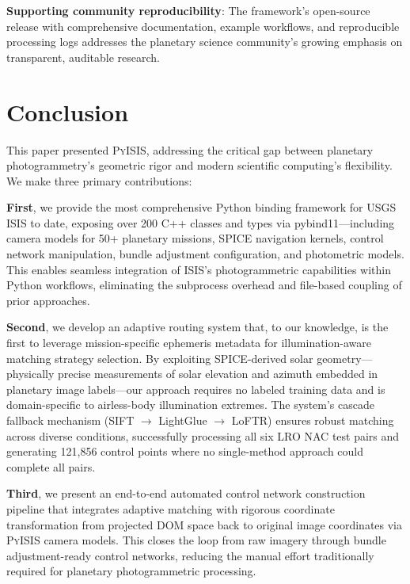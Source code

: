 \documentclass[lettersize,journal]{IEEEtran}
\newcommand{\pyisis}{\textsc{PyISIS}}
\begin{document}
\textbf{Supporting community reproducibility}: The framework's open-source release with comprehensive documentation, example workflows, and reproducible processing logs addresses the planetary science community's growing emphasis on transparent, auditable research.


\section{Conclusion}\label{sec:conclusion}

This paper presented \pyisis{}, addressing the critical gap between planetary photogrammetry's geometric rigor and modern scientific computing's flexibility. We make three primary contributions:

\textbf{First}, we provide the most comprehensive Python binding framework for USGS ISIS to date, exposing over 200 C++ classes and types via pybind11---including camera models for 50+ planetary missions, SPICE navigation kernels, control network manipulation, bundle adjustment configuration, and photometric models. This enables seamless integration of ISIS's photogrammetric capabilities within Python workflows, eliminating the subprocess overhead and file-based coupling of prior approaches.

\textbf{Second}, we develop an adaptive routing system that, to our knowledge, is the first to leverage mission-specific ephemeris metadata for illumination-aware matching strategy selection. By exploiting SPICE-derived solar geometry---physically precise measurements of solar elevation and azimuth embedded in planetary image labels---our approach requires no labeled training data and is domain-specific to airless-body illumination extremes. The system's cascade fallback mechanism (SIFT $\rightarrow$ LightGlue $\rightarrow$ LoFTR) ensures robust matching across diverse conditions, successfully processing all six LRO NAC test pairs and generating 121,856 control points where no single-method approach could complete all pairs.

\textbf{Third}, we present an end-to-end automated control network construction pipeline that integrates adaptive matching with rigorous coordinate transformation from projected DOM space back to original image coordinates via \pyisis{} camera models. This closes the loop from raw imagery through bundle adjustment-ready control networks, reducing the manual effort traditionally required for planetary photogrammetric processing.
\end{document}
